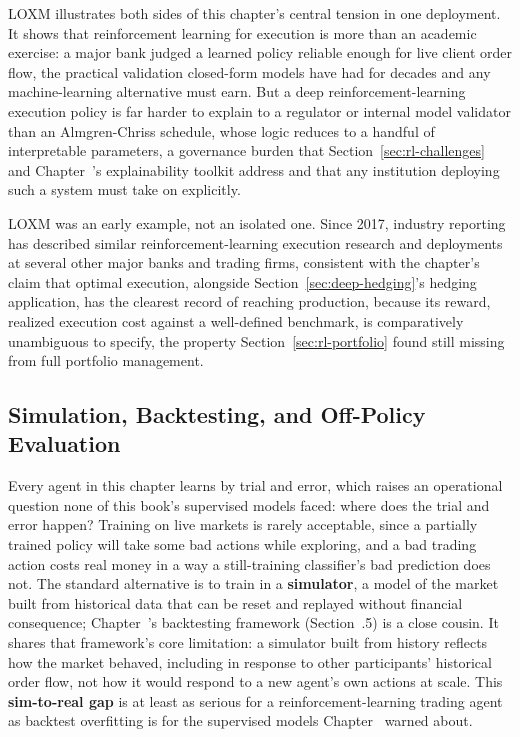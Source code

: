 \documentclass[../ai_in_finance]{subfiles}
\begin{document}
LOXM illustrates both sides of this chapter's central tension in one deployment. It shows that reinforcement learning for execution is more than an academic exercise: a major bank judged a learned policy reliable enough for live client order flow, the practical validation closed-form models have had for decades and any machine-learning alternative must earn. But a deep reinforcement-learning execution policy is far harder to explain to a regulator or internal model validator than an Almgren-Chriss schedule, whose logic reduces to a handful of interpretable parameters, a governance burden that Section~\ref{sec:rl-challenges} and Chapter~'s explainability toolkit address and that any institution deploying such a system must take on explicitly.

LOXM was an early example, not an isolated one. Since 2017, industry reporting has described similar reinforcement-learning execution research and deployments at several other major banks and trading firms, consistent with the chapter's claim that optimal execution, alongside Section~\ref{sec:deep-hedging}'s hedging application, has the clearest record of reaching production, because its reward, realized execution cost against a well-defined benchmark, is comparatively unambiguous to specify, the property Section~\ref{sec:rl-portfolio} found still missing from full portfolio management.

\subsection{Simulation, Backtesting, and Off-Policy Evaluation}
\label{sec:rl-evaluation}

Every agent in this chapter learns by trial and error, which raises an operational question none of this book's supervised models faced: where does the trial and error happen? Training on live markets is rarely acceptable, since a partially trained policy will take some bad actions while exploring, and a bad trading action costs real money in a way a still-training classifier's bad prediction does not. The standard alternative is to train in a \textbf{simulator}, a model of the market built from historical data that can be reset and replayed without financial consequence; Chapter~'s backtesting framework (Section~.5) is a close cousin. It shares that framework's core limitation: a simulator built from history reflects how the market behaved, including in response to other participants' historical order flow, not how it would respond to a new agent's own actions at scale. This \textbf{sim-to-real gap} is at least as serious for a reinforcement-learning trading agent as backtest overfitting is for the supervised models Chapter~ warned about.
\end{document}
